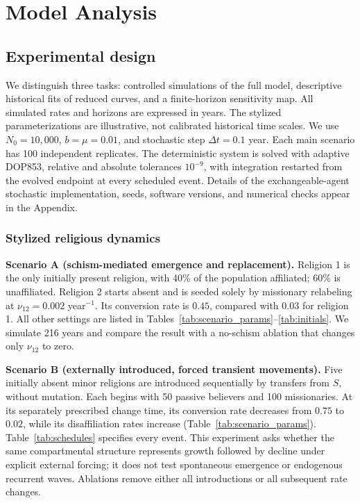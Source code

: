 \section{Model Analysis}
\subsection{Experimental design}
\label{sec:experiments}
We distinguish three tasks: controlled simulations of the full model, descriptive historical fits of reduced curves, and a finite-horizon sensitivity map. All simulated rates and horizons are expressed in years. The stylized parameterizations are illustrative, not calibrated historical time scales. We use $N_0=10{,}000$, $b=\mu=0.01$, and stochastic step $\Delta t=0.1$ year. Each main scenario has 100 independent replicates. The deterministic system is solved with adaptive DOP853, relative and absolute tolerances $10^{-9}$, with integration restarted from the evolved endpoint at every scheduled event. Details of the exchangeable-agent stochastic implementation, seeds, software versions, and numerical checks appear in the Appendix.

\subsubsection{Stylized religious dynamics}


\textbf{Scenario A (schism-mediated emergence and replacement).}
Religion 1 is the only initially present religion, with 40\% of the population affiliated; 60\% is unaffiliated. Religion 2 starts absent and is seeded solely by missionary relabeling at $\nu_{12}=0.002$ year$^{-1}$. Its conversion rate is $0.45$, compared with $0.03$ for religion 1. All other settings are listed in Tables~\ref{tab:scenario_params}--\ref{tab:initials}. We simulate 216 years and compare the result with a no-schism ablation that changes only $\nu_{12}$ to zero.

\textbf{Scenario B (externally introduced, forced transient movements).}
Five initially absent minor religions are introduced sequentially by transfers from $S$, without mutation. Each begins with 50 passive believers and 100 missionaries. At its separately prescribed change time, its conversion rate decreases from $0.75$ to $0.02$, while its disaffiliation rates increase (Table~\ref{tab:scenario_params}). Table~\ref{tab:schedules} specifies every event. This experiment asks whether the same compartmental structure represents growth followed by decline under explicit external forcing; it does not test spontaneous emergence or endogenous recurrent waves. Ablations remove either all introductions or all subsequent rate changes.


